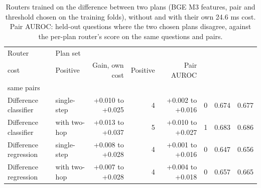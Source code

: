 \begin{table}[t]
\centering\small
\setlength{\tabcolsep}{4pt}
\caption{Routers trained on the difference between two plans (BGE M3 features, pair and threshold chosen on the training folds), without and with their own 24.6 ms cost. Pair AUROC: held-out questions where the two chosen plans disagree, against the per-plan router's score on the same questions and pairs.}
\label{tab:extra_diff}
\begin{tabular*}{\linewidth}{@{\extracolsep{\fill}}llrrrrrr}
\toprule
Router & Plan set & \begin{tabular}[b]{@{}r@{}}Gain, no own \\ cost\end{tabular} & Positive & Gain, own cost & Positive  & Pair AUROC & \begin{tabular}[b]{@{}r@{}}Per-plan LR, \\ same pairs\end{tabular} \\
\midrule
Difference classifier & single-step & +0.010 to +0.025 & 4 & +0.002 to +0.016 & 0 & 0.674 & 0.677 \\
Difference classifier & with two-hop & +0.013 to +0.037 & 5 & +0.010 to +0.027 & 1 & 0.683 & 0.686 \\
Difference regression & single-step & +0.008 to +0.028 & 4 & +0.001 to +0.016 & 0 & 0.647 & 0.656 \\
Difference regression & with two-hop & +0.007 to +0.028 & 4 & +0.004 to +0.018 & 0 & 0.657 & 0.665 \\
\bottomrule
\end{tabular*}
\end{table}
